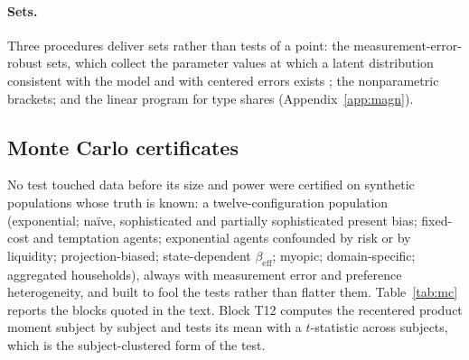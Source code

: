 \documentclass[11pt,a4paper]{article}
\theoremstyle{plain}
\theoremstyle{definition}
\newcommand{\beff}{\beta_{\mathrm{eff}}}
\begin{document}
\paragraph{Sets.} Three procedures deliver sets rather than tests of a point: the measurement-error-robust sets, which
collect the parameter values at which a latent distribution consistent with the model and with centered errors exists
\citep{schennach2014,aguiar2021}; the nonparametric brackets; and the linear program for type shares
(Appendix~\ref{app:magn}).

\subsection{Monte Carlo certificates}
\label{app:mc}

No test touched data before its size and power were certified on synthetic populations whose truth is known: a
twelve-configuration population (exponential; na\"ive, sophisticated and partially sophisticated present bias;
fixed-cost and temptation agents; exponential agents confounded by risk or by liquidity; projection-biased;
state-dependent $\beff$; myopic; domain-specific; aggregated households), always with measurement error and
preference heterogeneity, and built to fool the tests rather than flatter them. Table~\ref{tab:mc} reports the blocks
quoted in the text. Block T12 computes the recentered product moment subject by subject and tests its mean with a
$t$-statistic across subjects, which is the subject-clustered form of the test.
\end{document}
